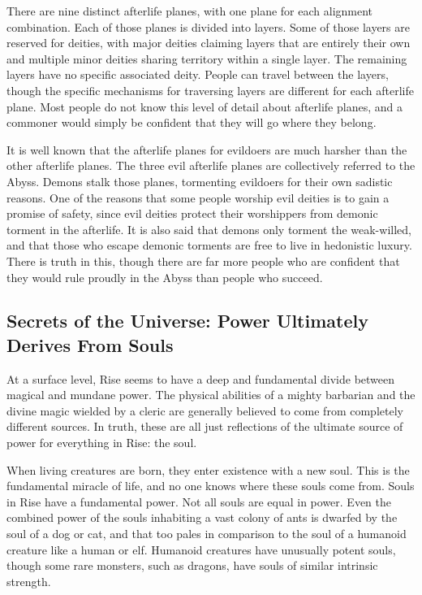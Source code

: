         There are nine distinct afterlife planes, with one plane for each alignment combination.
        Each of those planes is divided into layers.
        Some of those layers are reserved for deities, with major deities claiming layers that are entirely their own and multiple minor deities sharing territory within a single layer.
        The remaining layers have no specific associated deity.
        People can travel between the layers, though the specific mechanisms for traversing layers are different for each afterlife plane.
        Most people do not know this level of detail about afterlife planes, and a commoner would simply be confident that they will go where they belong.

        It is well known that the afterlife planes for evildoers are much harsher than the other afterlife planes.
        The three evil afterlife planes are collectively referred to the Abyss.
        Demons stalk those planes, tormenting evildoers for their own sadistic reasons.
        One of the reasons that some people worship evil deities is to gain a promise of safety, since evil deities protect their worshippers from demonic torment in the afterlife.
        It is also said that demons only torment the weak-willed, and that those who escape demonic torments are free to live in hedonistic luxury.
        There is truth in this, though there are far more people who are confident that they would rule proudly in the Abyss than people who succeed.

    \subsection{Secrets of the Universe: Power Ultimately Derives From Souls}
        At a surface level, Rise seems to have a deep and fundamental divide between magical and mundane power.
        The physical abilities of a mighty barbarian and the divine magic wielded by a cleric are generally believed to come from completely different sources.
        In truth, these are all just reflections of the ultimate source of power for everything in Rise: the soul.

        When living creatures are born, they enter existence with a new soul.
        This is the fundamental miracle of life, and no one knows where these souls come from.
        Souls in Rise have a fundamental power.
        Not all souls are equal in power.
        Even the combined power of the souls inhabiting a vast colony of ants is dwarfed by the soul of a dog or cat, and that too pales in comparison to the soul of a humanoid creature like a human or elf.
        Humanoid creatures have unusually potent souls, though some rare monsters, such as dragons, have souls of similar intrinsic strength.

